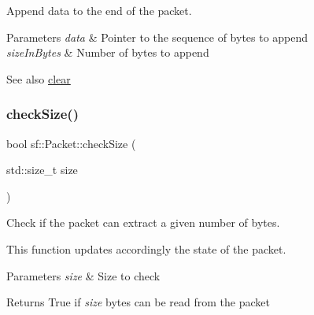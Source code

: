 Append data to the end of the packet. 


\begin{DoxyParams}{Parameters}
{\em data} & Pointer to the sequence of bytes to append \\
\hline
{\em size\+In\+Bytes} & Number of bytes to append\\
\hline
\end{DoxyParams}
\begin{DoxySeeAlso}{See also}
\mbox{\hyperlink{classsf_1_1_packet_a133ea8b8fe6e93c230f0d79f19a3bf0d}{clear}} \begin{DoxyVerb}\end{DoxyVerb}
 
\end{DoxySeeAlso}
\mbox{\label{classsf_1_1_packet_a54bea2433002686cf1de8c5c6466fe5f}} 
\subsubsection{\texorpdfstring{checkSize()}{checkSize()}}
{\footnotesize\ttfamily bool sf\+::\+Packet\+::check\+Size (\begin{DoxyParamCaption}\item[{std\+::size\+\_\+t}]{size }\end{DoxyParamCaption})\hspace{0.3cm}{\ttfamily [private]}}



Check if the packet can extract a given number of bytes. 

This function updates accordingly the state of the packet.


\begin{DoxyParams}{Parameters}
{\em size} & Size to check\\
\hline
\end{DoxyParams}
\begin{DoxyReturn}{Returns}
True if {\itshape size} bytes can be read from the packet \begin{DoxyVerb}\end{DoxyVerb}
 
\end{DoxyReturn}
\mbox{\label{classsf_1_1_packet_a133ea8b8fe6e93c230f0d79f19a3bf0d}} 
